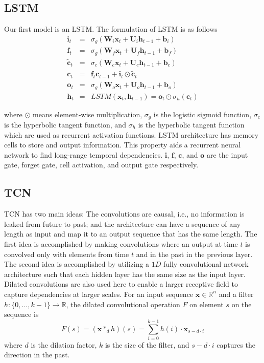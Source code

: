 \documentclass[12pt, A4]{article}
\begin{document}
\subsection{LSTM}
Our first model is an LSTM. The formulation of LSTM is as follows
\begin{eqnarray}
	\mathbf{i}_{t} &=& \sigma_{g}( \mathbf{W}_{i}\mathbf{x}_{t} + \mathbf{U}_{i}\mathbf{h}_{t-1} + \mathbf{b}_{i} ) \\
	\mathbf{f}_{t} &=& \sigma_{g}( \mathbf{W}_{f}\mathbf{x}_{t} + \mathbf{U}_{f}\mathbf{h}_{t-1} + \mathbf{b}_{f}  ) \\
	\tilde{\mathbf{c}}_{t} &=& \sigma_{c}( \mathbf{W}_{c}\mathbf{x}_{t} + \mathbf{U}_{c}\mathbf{h}_{t-1} + \mathbf{b}_{c}  ) \\
	\mathbf{c}_{t} &=& \mathbf{f}_{t}\mathbf{c}_{t-1} + \mathbf{i}_{t} \odot \tilde{\mathbf{c}}_{t} \\
	\mathbf{o}_{t} &=& \sigma_{g}(\mathbf{W}_{o}\mathbf{x}_{t} + \mathbf{U}_{o}\mathbf{h}_{t-1} + \mathbf{b}_{o} ) \\
	\mathbf{h}_{t} &=& LSTM(\mathbf{x}_{t}, \mathbf{h}_{t-1}) = \mathbf{o}_{t} \odot \sigma_{h}(\mathbf{c}_{t})
\end{eqnarray}

where $\odot$ means element-wise multiplication, $\sigma_{g}$ is the logistic sigmoid function, $\sigma_{c}$ is the hyperbolic tangent function, and  $\sigma_{h}$ is the hyperbolic tangent function which are used as recurrent activation functions. LSTM architecture has memory cells to store and output information. This property aids a recurrent neural network to find long-range temporal dependencies. $\mathbf{i}$, $\mathbf{f}$, $\mathbf{c}$, and $\mathbf{o}$ are the input gate, forget gate, cell activation, and output gate respectively.

\subsection{TCN}
TCN has two main ideas: The convolutions are causal, i.e., no information is leaked from future to past; and the architecture can have a sequence of any length as input and map it to an output sequence that has the same length. The first idea is accomplished by making convolutions where an output at time $t$ is convolved only with elements from time $t$ and in the past in the previous layer. The second idea is accomplished by utilizing a $1D$ fully convolutional network architecture such that each hidden layer has the same size as the input layer. Dilated convolutions are also used here to enable a larger receptive field to capture dependencies at larger scales. For an input sequence $\mathbf{x} \in \mathbb{R}^{n}$ and a filter $h: \{0,...,k-1\} \rightarrow \mathbb{R}$, the dilated convolutional operation $F$ on element $s$ on the sequence is
\begin{equation}
	F(s) = (\mathbf{x} \ast_{d} h)(s) = \sum_{i=0}^{k-1}h(i)\cdot \mathbf{x}_{s-d\cdot i}
\end{equation}
where $d$ is the dilation factor, $k$ is the size of the filter, and $s-d\cdot i$ captures the direction in the past. \\
\end{document}
